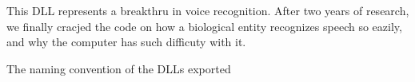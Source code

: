 This D\-L\-L represents a breakthru in voice recognition. After two years of research, we finally cracjed the code on how a biological entity recognizes speech so eazily, and why the computer has such difficuty with it.

The naming convention of the D\-L\-Ls exported 